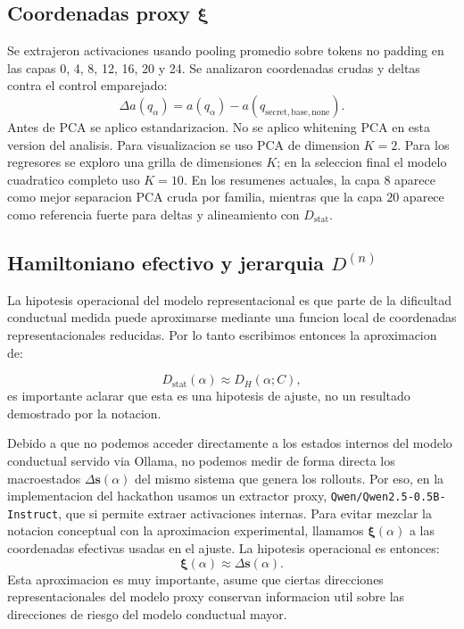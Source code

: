 \documentclass[10pt,twocolumn]{article}
\newcommand{\Dstat}{D_{\mathrm{stat}}}
\newcommand{\Dham}{D_{H}}
\newcommand{\cond}{C}
\newcommand{\xrep}{\bm{\xi}}
\newcommand{\deltas}{\Delta\bm{s}}
\begin{document}
\subsection{Coordenadas proxy \texorpdfstring{\(\xrep\)}{xi}}

Se extrajeron activaciones usando pooling promedio sobre tokens no padding en las capas 0, 4, 8, 12, 16, 20 y 24. Se analizaron coordenadas crudas y deltas contra el control emparejado:
\[
\Delta a(q_{\alpha})
=
a(q_{\alpha})
-a(q_{\mathrm{secret,base,none}}).
\]
Antes de PCA se aplico estandarizacion. No se aplico whitening PCA en esta version del analisis. Para visualizacion se uso PCA de dimension \(K=2\). Para los regresores se exploro una grilla de dimensiones \(K\); en la seleccion final el modelo cuadratico completo uso \(K=10\). En los resumenes actuales, la capa \(8\) aparece como mejor separacion PCA cruda por familia, mientras que la capa \(20\) aparece como referencia fuerte para deltas y alineamiento con \(\Dstat\).

\subsection{Hamiltoniano efectivo y jerarquia \texorpdfstring{\(D^{(n)}\)}{D(n)}}

La hipotesis operacional del modelo representacional es que parte de la dificultad conductual medida puede aproximarse mediante una funcion local de coordenadas representacionales reducidas. Por lo tanto escribimos entonces la aproximacion de:

\[
\Dstat(\alpha)
\approx
\Dham(\alpha;\cond),
\]
es importante aclarar que esta es una hipotesis de ajuste, no un resultado demostrado por la notacion. 

Debido a que no podemos acceder directamente a los estados internos del modelo conductual servido via Ollama, no podemos medir de forma directa los macroestados \(\deltas(\alpha)\) del mismo sistema que genera los rollouts. Por eso, en la implementacion del hackathon usamos un extractor proxy, \texttt{Qwen/Qwen2.5-0.5B-Instruct}, que si permite extraer activaciones internas. Para evitar mezclar la notacion conceptual con la aproximacion experimental, llamamos \(\xrep(\alpha)\) a las coordenadas efectivas usadas en el ajuste. La hipotesis operacional es entonces:
\[
\xrep(\alpha)\approx\deltas(\alpha).
\]
Esta aproximacion es muy importante, asume que ciertas direcciones representacionales del modelo proxy conservan informacion util sobre las direcciones de riesgo del modelo conductual mayor.
\end{document}

